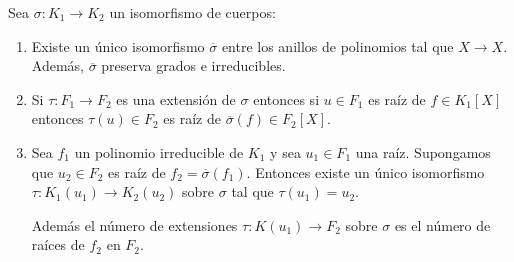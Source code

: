 \begin{proposition}
	Sea $\sigma:K_1 \to K_2$ un isomorfismo de cuerpos:
	
	\begin{enumerate}
		\item Existe un único isomorfismo $\overline{\sigma}$ entre los anillos de polinomios tal que $X \to X$. Además, $\overline{\sigma}$ preserva grados e irreducibles.  
		\item Si $\tau:F_1 \to F_2$ es una extensión de $\sigma$ entonces si $u \in F_1$ es raíz de $f \in K_1[X]$ entonces $\tau(u) \in F_2$ es raíz de $\overline{\sigma}(f) \in F_2[X]$. 	
		\item Sea $f_1$ un polinomio irreducible de $K_1$ y sea $u_1 \in F_1$ una raíz. Supongamos que $u_2 \in F_2$ es raíz de $f_2 = \overline{\sigma}(f_1)$. Entonces existe un único isomorfismo $\tau: K_1(u_1) \to K_2(u_2)$ sobre $\sigma$ tal que $\tau(u_1) = u_2$.
		
		Además el número de extensiones $\tau:K(u_1) \to F_2$ sobre $\sigma$ es el número de raíces de $f_2$ en $F_2$.
	
		
	\end{enumerate}
\end{proposition}
